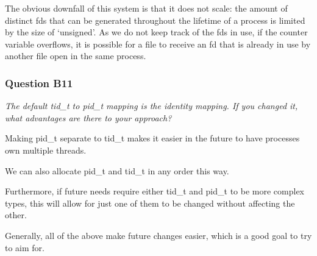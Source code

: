 The obvious downfall of this system is that it does not scale: the amount of distinct fds that can be generated throughout the lifetime of a process is limited by the size of `unsigned'. As we do not keep track of the fds in use, if the counter variable overflows, it is possible for a file to receive an fd that is already in use by another file open in the same process.


\subsubsection*{Question B11} %
\textit{The default tid\_t to pid\_t mapping is the identity mapping. If you changed it, what advantages are there to your approach?}

Making pid\_t separate to tid\_t makes it easier in the future to have processes
own multiple threads.

We can also allocate pid\_t and tid\_t in any order this way.

Furthermore, if future needs require either tid\_t and pid\_t to be more complex
types, this will allow for just one of them to be changed without affecting the
other.

Generally, all of the above make future changes easier, which is a good goal to
try to aim for.
